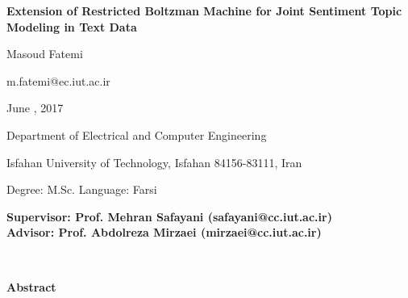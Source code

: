 
\thispagestyle{empty}

\begin{latin}
	\begin{center}
		
		{\Huge \textbf{Extension of Restricted Boltzman Machine for Joint Sentiment Topic Modeling in Text Data}}
		
		\vspace{1cm}
		
		{\LARGE{Masoud Fatemi}}
		
		\vspace{0.2cm}
		
		{\small m.fatemi@ec.iut.ac.ir}
		
		\vspace{0.5cm}
		
		June , 2017
		
		\vspace{0.5cm}
		
		Department of Electrical and Computer Engineering
		
		\vspace{0.2cm}
		
		Isfahan University of Technology, Isfahan 84156-83111, Iran
		
		\vspace{0.2cm}
		
		Degree: M.Sc. \hspace*{3cm} Language: Farsi
		
		\vspace{1cm}
		
		{\small\textbf{Supervisor: Prof. Mehran Safayani (safayani@cc.iut.ac.ir)}}\\
		{\small\textbf{Advisor: Prof. Abdolreza Mirzaei (mirzaei@cc.iut.ac.ir)}}
	\end{center}
	~\vfill
	
	
	
	\noindent\textbf{Abstract}
	

\end{latin}
